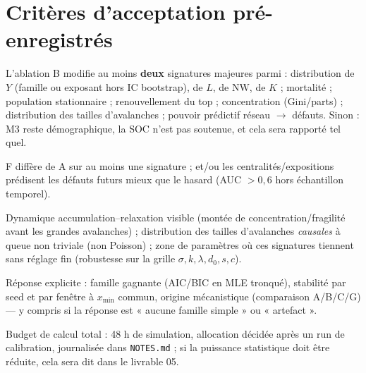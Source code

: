 \documentclass[11pt,a4paper]{article}
\newcommand{\NW}{\mathrm{NW}}
\newcommand{\code}[1]{\texttt{#1}}
\begin{document}
\section{Critères d'acceptation pré-enregistrés}
\label{sec:accept}

\begin{description}[leftmargin=1.8em, itemsep=3pt]
\item[Crédit causal.] L'ablation B modifie au moins \textbf{deux} signatures
  majeures parmi : distribution de $Y$ (famille ou exposant hors IC
  bootstrap), de $L$, de $\NW$, de $K$ ; mortalité ; population
  stationnaire ; renouvellement du top ; concentration (Gini/parts) ;
  distribution des tailles d'avalanches ; pouvoir prédictif
  réseau $\to$ défauts. Sinon : M3 reste démographique, la SOC n'est pas
  soutenue, et cela sera rapporté tel quel.
\item[Réseau.] F diffère de A sur au moins une signature ; et/ou les
  centralités/expositions prédisent les défauts futurs mieux que le hasard
  (AUC $> 0{,}6$ hors échantillon temporel).
\item[SOC.] Dynamique accumulation--relaxation visible (montée de
  concentration/fragilité avant les grandes avalanches) ; distribution des
  tailles d'avalanches \emph{causales} à queue non triviale (non Poisson) ;
  zone de paramètres où ces signatures tiennent sans réglage fin (robustesse
  sur la grille $\sigma, k, \lambda, d_0, s, c$).
\item[Par variable.] Réponse explicite : famille gagnante (AIC/BIC en MLE
  tronqué), stabilité par seed et par fenêtre à $x_{\min}$ commun, origine
  mécanistique (comparaison A/B/C/G) --- y compris si la réponse est « aucune
  famille simple » ou « artefact ».
\end{description}
Budget de calcul total : 48 h de simulation, allocation décidée après un run
de calibration, journalisée dans \code{NOTES.md} ; si la puissance
statistique doit être réduite, cela sera dit dans le livrable 05.
\end{document}
